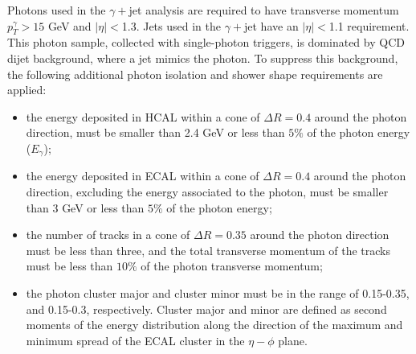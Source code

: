 Photons used in the $\gamma+$jet analysis are required to have  
transverse momentum $p_{T}^{\gamma}>15$ GeV and  $|\eta|<$1.3. Jets used
in the $\gamma+$jet have an $|\eta|<$1.1 requirement. 
This photon sample, collected with single-photon triggers, is dominated by QCD dijet
background, where a jet mimics the  photon. To suppress this background,
the following additional photon isolation and shower shape requirements are applied:

\begin{itemize}

\item
the energy deposited in HCAL within a cone of $\Delta R=0.4$ around the  
photon direction,
 must be smaller than 2.4 GeV or less than $5\%$ of the photon energy ($E_{\gamma}$);

\item
the energy deposited in ECAL within a cone of $\Delta R=0.4$ around the 
photon direction, excluding the energy associated to the photon, must be   
smaller than 3 GeV or less than $5\%$ of the photon energy;

\item
the number of tracks in a cone of $\Delta R=0.35$ around the photon
direction must be less than three, and the total
transverse momentum of the tracks must be less than $10\%$ of the photon
transverse momentum;

\item
the photon cluster major and cluster minor must be in the range of
0.15-0.35, and 0.15-0.3, respectively. Cluster major and minor
are defined as second moments of the energy distribution along
the direction of the maximum and minimum spread of the ECAL
cluster in the $\eta-\phi$ plane.


\end{itemize}
